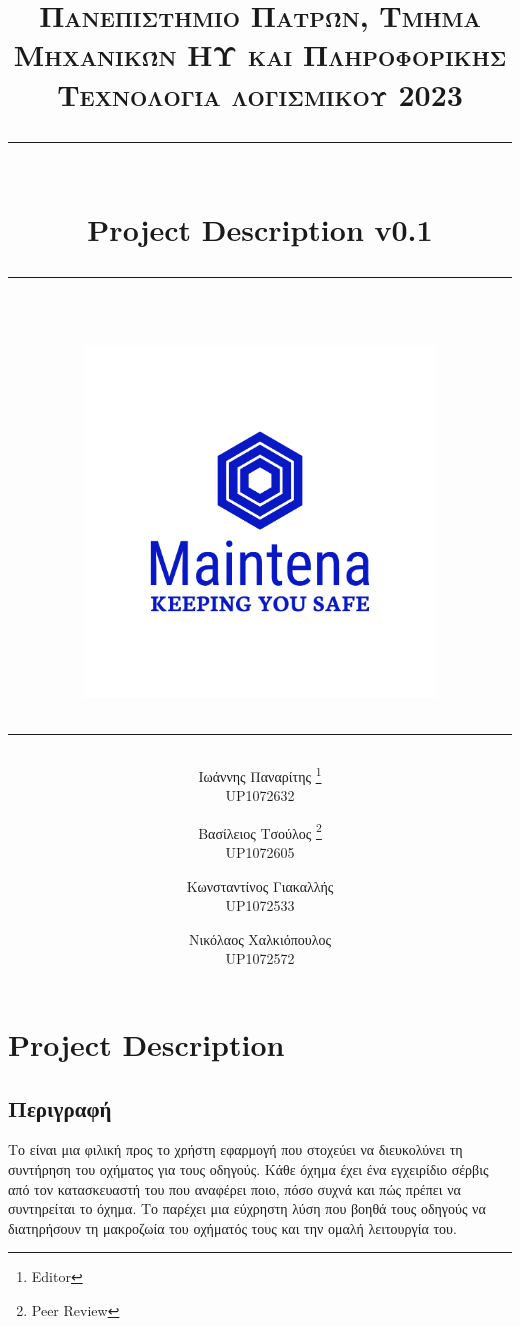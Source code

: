 \documentclass[11pt]{scrartcl} %
\title{	
	\normalfont\normalsize
	\textsc{Πανεπιστήμιο Πατρών, Τμήμα Μηχανικών ΗΥ και Πληροφορικής \\Τεχνολογία λογισμικού 2023}\\ %
	\vspace{25pt} %
	\rule{\linewidth}{0.5pt}\\ %
	\vspace{20pt} %
    {\Large Project Description v0.1}\\ %
	\vspace{12pt} %
	\rule{\linewidth}{0.5pt}\\ %
	\vspace{12pt} %
    \includegraphics[width=0.7\textwidth]{../../brand/png/logo-transparent.png}
        \rule{\linewidth}{2pt}
}
\author{
Ιωάννης Παναρίτης \thanks{Editor} \\UP1072632 \and Βασίλειος Τσούλος \thanks{Peer Review} \\UP1072605 \and Κωνσταντίνος Γιακαλλής \\UP1072533 \and \hspace{-0.9cm} Νικόλαος Χαλκιόπουλος \\ \hspace{-0.9cm}UP1072572
}
\date{} %
\begin{document}
\maketitle
\pagebreak
\Large

\tableofcontents

\section{Project Description}

\subsection{Περιγραφή}

Το  είναι μια φιλική προς το χρήστη εφαρμογή που στοχεύει να διευκολύνει τη συντήρηση του οχήματος για τους οδηγούς. Κάθε όχημα έχει ένα εγχειρίδιο σέρβις από τον κατασκευαστή του που αναφέρει ποιο, πόσο συχνά και πώς πρέπει να συντηρείται το όχημα. Το  παρέχει μια εύχρηστη λύση που βοηθά τους οδηγούς να διατηρήσουν τη μακροζωία του οχήματός τους και την ομαλή λειτουργία του.
\end{document}
